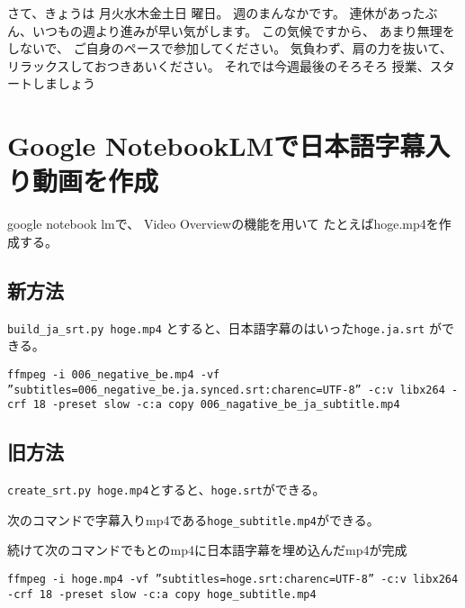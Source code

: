 \documentclass[12pt,jafontscale=0.9247]{jlreq}
\makeatletter
\newcommand{\DOWjpn}{%
	\DTMcomputedayofweekindex{\@dtm@currentyear-\@dtm@currentmonth-\@dtm@currentday}{\DOWindex}%
	\ifcase\DOWindex 月\or 火\or 水\or 木\or 金\or 土\or 日\fi%
}
\makeatother
\begin{document}
{さて、きょうは\DOWjpn{}曜日。
週のまんなかです。
連休があったぶん、いつもの週より進みが早い気がします。
この気候ですから、
あまり無理をしないで、
ご自身のペースで参加してください。
気負わず、肩の力を抜いて、
リラックスしておつきあいください。
%
それでは今週最後のそろそろ
授業、スタートしましょう
}

\newpage
\section*{Google NotebookLMで日本語字幕入り動画を作成}


google notebook lmで、
Video Overviewの機能を用いて
たとえばhoge.mp4を作成する。

\subsection*{新方法}

\verb|build_ja_srt.py hoge.mp4| とすると、日本語字幕のはいった\verb|hoge.ja.srt| ができる。

\begin{verbatim}
ffmpeg -i 006_negative_be.mp4 -vf ”subtitles=006_negative_be.ja.synced.srt:charenc=UTF-8” -c:v libx264 -crf 18 -preset slow -c:a copy 006_nagative_be_ja_subtitle.mp4
\end{verbatim}


\subsection*{旧方法}
\verb|create_srt.py hoge.mp4|とすると、\verb|hoge.srt|ができる。

次のコマンドで字幕入りmp4である\verb|hoge_subtitle.mp4|ができる。

続けて次のコマンドでもとのmp4に日本語字幕を埋め込んだmp4が完成


\begin{verbatim}
ffmpeg -i hoge.mp4 -vf ”subtitles=hoge.srt:charenc=UTF-8” -c:v libx264 -crf 18 -preset slow -c:a copy hoge_subtitle.mp4
\end{verbatim}

\bigskip
\end{document}

